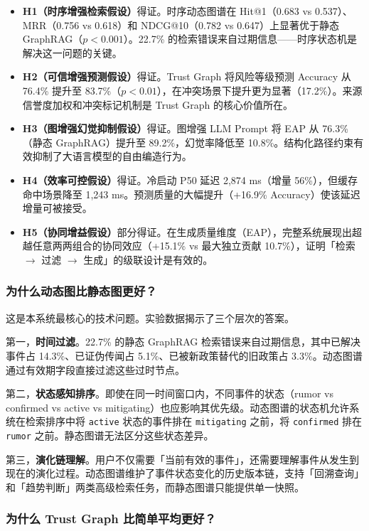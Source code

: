 \documentclass[12pt,a4paper]{article}
\begin{document}
\begin{itemize}
    \item \textbf{H1（时序增强检索假设）}得证。时序动态图谱在 Hit@1（0.683 vs 0.537）、MRR（0.756 vs 0.618）和 NDCG@10（0.782 vs 0.647）上显著优于静态 GraphRAG（$p < 0.001$）。22.7\% 的检索错误来自过期信息——时序状态机是解决这一问题的关键。
    \item \textbf{H2（可信增强预测假设）}得证。Trust Graph 将风险等级预测 Accuracy 从 76.4\% 提升至 83.7\%（$p < 0.01$），在冲突场景下提升更为显著（17.2\%）。来源信誉度加权和冲突标记机制是 Trust Graph 的核心价值所在。
    \item \textbf{H3（图增强幻觉抑制假设）}得证。图增强 LLM Prompt 将 EAP 从 76.3\%（静态 GraphRAG）提升至 89.2\%，幻觉率降低至 10.8\%。结构化路径约束有效抑制了大语言模型的自由编造行为。
    \item \textbf{H4（效率可控假设）}得证。冷启动 P50 延迟 2,874 ms（增量 56\%），但缓存命中场景降至 1,243 ms。预测质量的大幅提升（+16.9\% Accuracy）使该延迟增量可被接受。
    \item \textbf{H5（协同增益假设）}部分得证。在生成质量维度（EAP），完整系统展现出超越任意两两组合的协同效应（+15.1\% vs 最大独立贡献 10.7\%），证明「检索 $\to$ 过滤 $\to$ 生成」的级联设计是有效的。
\end{itemize}

\subsubsection{为什么动态图比静态图更好？}

这是本系统最核心的技术问题。实验数据揭示了三个层次的答案。

第一，\textbf{时间过滤}。22.7\% 的静态 GraphRAG 检索错误来自过期信息，其中已解决事件占 14.3\%、已证伪传闻占 5.1\%、已被新政策替代的旧政策占 3.3\%。动态图谱通过有效期字段直接过滤这些过时节点。

第二，\textbf{状态感知排序}。即使在同一时间窗口内，不同事件的状态（rumor vs confirmed vs active vs mitigating）也应影响其优先级。动态图谱的状态机允许系统在检索排序中将 \texttt{active} 状态的事件排在 \texttt{mitigating} 之前，将 \texttt{confirmed} 排在 \texttt{rumor} 之前。静态图谱无法区分这些状态差异。

第三，\textbf{演化链理解}。用户不仅需要「当前有效的事件」，还需要理解事件从发生到现在的演化过程。动态图谱维护了事件状态变化的历史版本链，支持「回溯查询」和「趋势判断」两类高级检索任务，而静态图谱只能提供单一快照。

\subsubsection{为什么 Trust Graph 比简单平均更好？}
\end{document}
